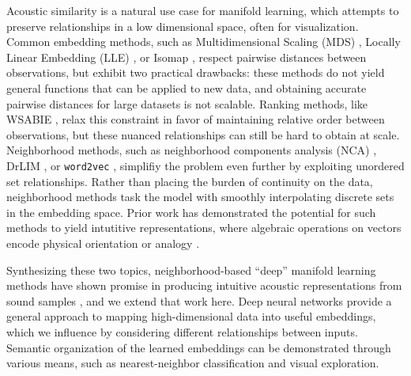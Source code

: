 \documentclass{article}
\begin{document}
Acoustic similarity is a natural use case for manifold learning, which attempts to preserve relationships in a low dimensional space, often for visualization.
Common embedding methods, such as Multidimensional Scaling (MDS) \cite{borg2005mds}, Locally Linear Embedding (LLE) \cite{roweis2000nonlinear}, or Isomap \cite{tenenbaum2000global}, respect pairwise distances between observations, but exhibit two practical drawbacks:
these methods do not yield general functions that can be applied to new data, and obtaining accurate pairwise distances for large datasets is not scalable.
Ranking methods, like WSABIE \cite{weston2011wsabie}, relax this constraint in favor of maintaining relative order between observations, but these nuanced relationships can still be hard to obtain at scale.
Neighborhood methods, such as neighborhood components analysis (NCA) \cite{goldberger2004neighbourhood, salakhutdinov2007learning}, DrLIM \cite{hadsell2006dimensionality}, or \texttt{word2vec}
\cite{mikolov2013distributed}, simplifiy the problem even further by exploiting unordered set relationships.
Rather than placing the burden of continuity on the data, neighborhood methods task the model with smoothly interpolating discrete sets in the embedding space.
Prior work has demonstrated the potential for such methods to yield intutitive representations, where algebraic operations on vectors encode physical orientation \cite{hadsell2006dimensionality} or analogy \cite{mikolov2013efficient}.

Synthesizing these two topics, neighborhood-based ``deep'' manifold learning methods have shown promise in producing intuitive acoustic representations from sound samples \cite{humphrey2011nlse}, and we extend that work here.
Deep neural networks provide a general approach to mapping high-dimensional data into useful embeddings, which we influence by considering different relationships between inputs.
Semantic organization of the learned embeddings can be demonstrated through various means, such as nearest-neighbor classification and visual exploration.
\end{document}
